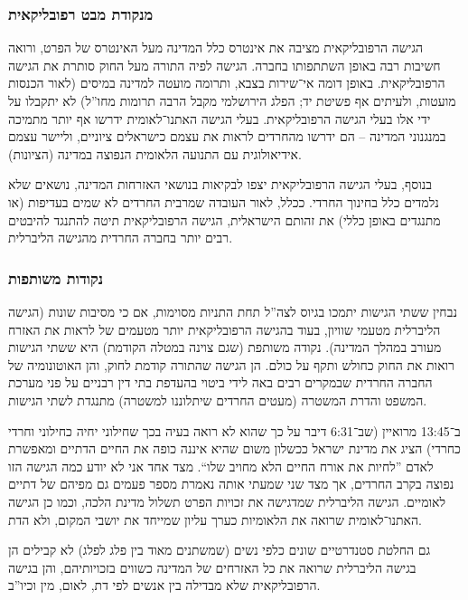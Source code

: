 \documentclass[]{../../../../tex/classes/styledArticle}
\begin{document}
	\subsubsection*{מנקודת מבט רפובליקאית}
	הגישה הרפובליקאית מציבה את אינטרס כלל המדינה מעל האינטרס של הפרט, ורואה חשיבות רבה באופן השתתפותו בחברה. הגישה לפיה התורה מעל החוק סותרת את הגישה הרפובליקאית. באופן דומה אי־שירות בצבא, ותרומה מועטה למדינה במיסים (לאור הכנסות מועטות, ולעיתים אף פשיטת יד; הפלג הירושלמי מקבל הרבה תרומות מחו''ל) לא יתקבלו על ידי אלו בעלי הגישה הרפובליקאית. בעלי הגישה האתנו־לאומית ידרשו אף יותר מתמיכה במנגנוני המדינה – הם ידרשו מהחרדים לראות את עצמם כישראלים ציוניים, וליישר עצמם אידיאולוגית עם התנועה הלאומית הנפוצה במדינה (הציונות). 
	
	בנוסף, בעלי הגישה הרפובליקאית יצפו לבקיאות בנושאי האזרחות המדינה, נושאים שלא נלמדים כלל בחינוך החרדי. 	ככלל, לאור העובדה שמרבית החרדים לא שמים בעדיפות (או מתנגדים באופן כללי) את זהותם הישראלית, הגישה הרפובליקאית תיטה להתנגד להיבטים רבים יותר בחברה החרדית מהגישה הליברלית. 
	
	\subsubsection*{נקודות משותפות}
	נבחין ששתי הגישות יתמכו בגיוס לצה''ל תחת התניות מסוימות, אם כי מסיבות שונות (הגישה הליברלית מטעמי שוויון, בעוד בהגישה הרפובליקאית יותר מטעמים של לראות את האזרח מעורב במהלך המדינה). נקודה משותפת (שגם צוינה במטלה הקודמת) היא ששתי הגישות רואות את החוק כחולש ותקף על כולם. הן הגישה שהתורה קודמת לחוק, והן האוטונומיה של החברה החרדית שבמקרים רבים באה לידי ביטוי בהעדפת בתי דין רבניים על פני מערכת המשפט והדרת המשטרה (מעטים החרדים שיתלוננו למשטרה) מתנגדת לשתי הגישות. 
	
	ב־13:45 מרואיין (שב־6:31 דיבר על כך שהוא לא רואה בעיה בכך שחילוני יחיה כחילוני וחרדי כחרדי) הציג את מדינת ישראל ככשלון משום שהיא איננה כופה את החיים הדתיים ומאפשרת לאדם ''לחיות את אורח החיים הלא מחויב שלו``. מצד אחד אני לא יודע כמה הגישה הזו נפוצה בקרב החרדים, אך מצד שני שמעתי אותה נאמרת מספר פעמים גם מפיהם של דתיים לאומיים. הגישה הליברלית שמדגישה את זכויות הפרט תשלול מדינת הלכה, וכמו כן הגישה האתנו־לאומית שרואה את הלאומיות כערך עליון שמייחד את יושבי המקום, ולא הדת. 
	
	גם החלטת סטנדרטיים שונים כלפי נשים (שמשתנים מאוד בין פלג לפלג) לא קבילים הן בגישה הליברלית שרואה את כל האזרחים של המדינה כשווים בזכויותיהם, והן בגישה הרפובליקאית שלא מבדילה בין אנשים לפי דת, לאום, מין וכיו''ב. 
	
	
	\ndoc
\end{document}
